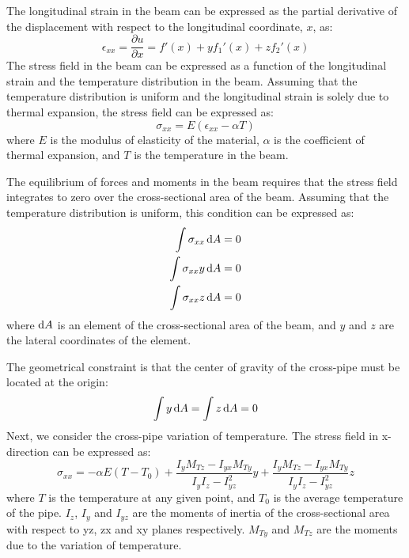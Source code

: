 The longitudinal strain in the beam can be expressed as the partial derivative of the displacement with respect to the longitudinal coordinate, $x$, as:
\begin{equation}
    \epsilon_{xx} = \frac{\partial u}{\partial x} = f'(x) + yf_1'(x) + zf_2'(x)
\end{equation}
The stress field in the beam can be expressed as a function of the longitudinal strain and the temperature distribution in the beam. Assuming that the temperature distribution is uniform and the longitudinal strain is solely due to thermal expansion, the stress field can be expressed as:
\begin{equation}
    \sigma_{xx} = E \left(\epsilon_{xx} - \alpha T\right)
\end{equation}
where $E$ is the modulus of elasticity of the material, $\alpha$ is the coefficient of thermal expansion, and $T$ is the temperature in the beam.

The equilibrium of forces and moments in the beam requires that the stress field integrates to zero over the cross-sectional area of the beam. Assuming that the temperature distribution is uniform, this condition can be expressed as:
\begin{align}
    \int \sigma_{xx} \dif A   & = 0 \\
    \int \sigma_{xx} y \dif A & = 0 \\
    \int \sigma_{xx} z \dif A & = 0
\end{align}
where $\dif A$ is an element of the cross-sectional area of the beam, and $y$ and $z$ are the lateral coordinates of the element.

The geometrical constraint is that the center of gravity of the cross-pipe must be located at the origin:
\begin{equation}
    \int y \dif A = \int z \dif A = 0
\end{equation}
Next, we consider the cross-pipe variation of temperature. The stress field in x-direction can be expressed as:
\begin{equation}
    \sigma_{xx} = -\alpha E\left(T - T_0\right) + \frac{I_yM_{Tz}-I_{yx}M_{Ty}}{I_yI_z-I^2_{yz}}y + \frac{I_yM_{Tz}-I_{yx}M_{Ty}}{I_yI_z-I^2_{yz}}z
\end{equation}
where $T$ is the temperature at any given point, and $T_0$ is the average temperature of the pipe. $I_z$, $I_y$ and $I_{yz}$ are the moments of inertia of the cross-sectional area with respect to yz, zx and xy planes respectively. $M_{Ty}$ and $M_{Tz}$ are the moments due to the variation of temperature.

